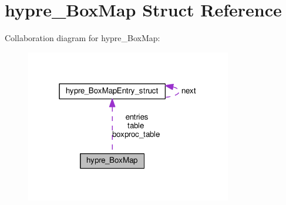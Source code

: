 \hypertarget{structhypre__BoxMap}{}\section{hypre\+\_\+\+Box\+Map Struct Reference}
\label{structhypre__BoxMap}


Collaboration diagram for hypre\+\_\+\+Box\+Map\+:
\nopagebreak
\begin{figure}[H]
\begin{center}
\leavevmode
\includegraphics[width=255pt]{structhypre__BoxMap__coll__graph}
\end{center}
\end{figure}
